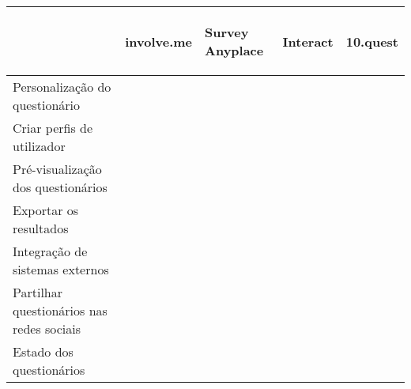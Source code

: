 \newpage

\renewcommand{\arraystretch}{2}
\setlength\arrayrulewidth{1pt}
\begin{table}[!ht]  
	\begin{center}
		\begin{tabular}{|p{4cm}|p{0.1cm}|p{0.1cm}|p{0.1cm}|p{0.1cm}|}
			\cline{2-5}
			\multicolumn{1}{c|}{} & \hspace{0.2cm}\begin{sideways}involve.me\end{sideways} & \hspace{0.4cm}\begin{sideways}Survey Anyplace\end{sideways} & \hspace{0.2cm}\begin{sideways}Interact\end{sideways} &\hspace{0.2cm}\begin{sideways} 10.quest\end{sideways}\\ \hline
			
			
			Personalização do questionário & \cellcolor{green!80}  & \cellcolor{green!80}  & \cellcolor{green!80} & \cellcolor{green!80} \\ \hline
			
			
			Criar perfis de utilizador & \cellcolor{red!80}   & \cellcolor{red!80}  & \cellcolor{red!80} & \cellcolor{green!80}  \\ \hline
					
			Pré-visualização dos questionários &\cellcolor{green!80}  & \cellcolor{green!80} & \cellcolor{green!80} & \cellcolor{green!80}  \\ \hline
			
			Exportar os resultados &\cellcolor{green!80}  & \cellcolor{green!80} & \cellcolor{green!80} & \cellcolor{green!80}  \\ \hline
			
			Integração de sistemas externos & \cellcolor{green!80}  & \cellcolor{green!80} & \cellcolor{green!80} & \cellcolor{red!80}  \\ \hline
			
			Partilhar questionários nas redes sociais &\cellcolor{green!80}  & \cellcolor{yellow!80} & \cellcolor{green!80} & \cellcolor{green!80}  \\ \hline
			
			Estado dos questionários &\cellcolor{green!80}  & \cellcolor{red!80} & \cellcolor{red!80} & \cellcolor{green!80}  \\ \hline
			

\end{tabular}
\end{center}
\end{table}
